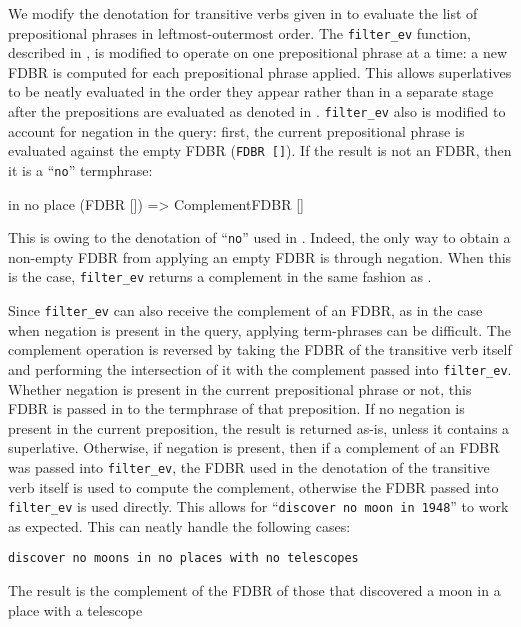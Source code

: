 \documentclass[../main.tex]{subfiles}
\begin{document}
\begin{refsection}
We modify the denotation for transitive verbs given in \cite{peelar2020webistjournal} to evaluate the list of prepositional phrases in leftmost-outermost order.  The \texttt{filter\_ev} function, described in \cite{peelar2016accommodating}, is modified to operate on one prepositional phrase at a time: a new FDBR is computed for each prepositional phrase applied.  This allows superlatives to be neatly evaluated in the order they appear rather than in a separate stage after the prepositions are evaluated as denoted in \cite{frostpeelar2019}.  \texttt{filter\_ev} also is modified to account for negation in the query: first, the current prepositional phrase is evaluated against the empty FDBR (\texttt{FDBR []}).  If the result is not an FDBR, then it is a ``\texttt{no}'' termphrase:
\begin{code}
    in no place (FDBR []) => ComplementFDBR []
\end{code}
This is owing to the denotation of ``\texttt{no}'' used in .  Indeed, the only way to obtain a non-empty FDBR from applying an empty FDBR is through negation.  When this is the case, \texttt{filter\_ev} returns a complement in the same fashion as \cite{frostboulos2002}.

Since \texttt{filter\_ev} can also receive the complement of an FDBR, as in the case when negation is present in the query, applying term-phrases can be difficult.  The complement operation is reversed by taking the FDBR of the transitive verb itself and performing the intersection of it with the complement passed into \texttt{filter\_ev}.  Whether negation is present in the current prepositional phrase or not, this FDBR is passed in to the termphrase of that preposition.  If no negation is present in the current preposition, the result is returned as-is, unless it contains a superlative.  Otherwise, if negation is present, then if a complement of an FDBR was passed into \texttt{filter\_ev}, the FDBR used in the denotation of the transitive verb itself is used to compute the complement, otherwise the FDBR passed into \texttt{filter\_ev} is used directly. This allows for ``\texttt{discover no moon in 1948}'' to work as expected. This can neatly handle the following cases:

\examplespacing

\texttt{discover no moons in no places with no telescopes}

\examplespacing

\noindent The result is the complement of the FDBR of those that discovered a moon in a place with a telescope


\end{refsection}
\end{document}
